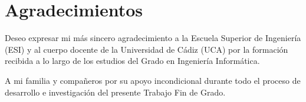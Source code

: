 \newpage{\ }
\thispagestyle{empty}

\chapter*{Agradecimientos}

Deseo expresar mi más sincero agradecimiento a la Escuela Superior de Ingeniería (ESI) y al cuerpo docente de la Universidad de Cádiz (UCA) por la formación recibida a lo largo de los estudios del Grado en Ingeniería Informática.

A mi familia y compañeros por su apoyo incondicional durante todo el proceso de desarrollo e investigación del presente Trabajo Fin de Grado.